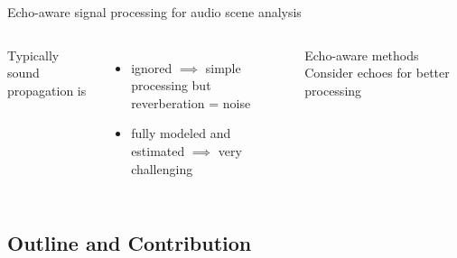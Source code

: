 \begin{frame}[t]{\alert{Echo-aware} signal processing for audio scene analysis}
    \begin{columns}
        Typically sound propagation is
        \begin{itemize}
            \item ignored $\implies$ simple processing but reverberation = noise
            \item fully modeled and estimated $\implies$ very challenging
        \end{itemize}

        \begin{mydefblock}{Echo-aware methods}
            Consider echoes for better processing
        \end{mydefblock}
    \end{columns}

\end{frame}

\subsection*{Outline and Contribution}

